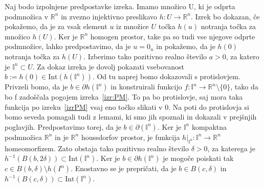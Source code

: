 \documentclass[mat1]{fmfdelo}
\newcommand{\R}{\mathbb R}
\newcommand{\I}{\mathbb I}
\newcommand{\0}{\underline{0}}
\newcommand{\Int}{\text{Int}}
\begin{document}
\begin{dokaz}
Naj bodo izpolnjene predpostavke izreka. Imamo množico U, ki je odprta podmnožica v $\R^n$ in zvezno injektivno preslikavo $h : U \rightarrow \R^n$. Izrek bo dokazan, če pokažemo, da je za vsak element $u$ iz množice $U$ točka $h(u)$ notranja točka za množico $h(U)$. Ker je $\R^n$ homogen prostor, take pa so tudi vse njegove odprte podmnožice, lahko predpostavimo, da je $u = 0_n$ in pokažemo, da je $h(0)$ notranja točka za $h(U)$. Izberimo tako pozitivno realno število $a > 0$, za katero je $\I^n \subset U$. Za dokaz izreka  je dovolj pokazati vsebovanost $b := h(0) \in \Int(h(\I^n))$. Od tu naprej bomo dokazovali s protislovjem. Privzeli bomo, da je $b \in \partial h(\I^n)$ in konstruirali funkcijo $f : \I^n \to \R^n \setminus \{ 0 \}$, tako da bo f zadoščala pogojem izreka~\ref{izr:PM}. To pa bo protislovje, saj mora taka funkcija po izreku~\ref{izrPM} vsaj eno točko slikati v $0$. Na poti do protislovja si bomo seveda pomagali tudi z lemami, ki smo jih spoznali in dokazali v prejšnjih poglavjih. Predpostavimo torej, da je $b \in \partial (\I^n)$. Ker je $\I^n$ kompaktna podmnožica $\R^n$ in je $\R^n$ houssdorfov prostor, je funkcija $h|_{\I^n} : \I^n \to \R^n$ homeomorfizem. Zato obstaja tako pozitivno realno število $\delta > 0$, za katerega je $h^{-1}(B(b, 2 \delta)) \subset \Int(\I^n)$. Ker je $b \in \partial h(\I^n)$ je mogoče poiskati tak $c \in B(b, \delta) \setminus h(I^n)$. Enostavno se je prepričati, da je $b \in B(c, \delta)$ in $h^{-1} (B(c, \delta)) \subset \Int (\I^n)$.

\begin{figure}[h!]
	\centering
\end{figure}
\end{dokaz}
\end{document}
